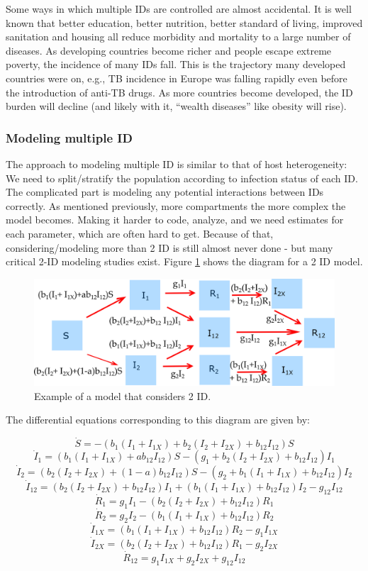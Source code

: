 \documentclass[]{book}
\theoremstyle{definition}
\theoremstyle{definition}
\theoremstyle{definition}
\theoremstyle{remark}
\begin{document}
Some ways in which multiple IDs are controlled are almost accidental. It
is well known that better education, better nutrition, better standard
of living, improved sanitation and housing all reduce morbidity and
mortality to a large number of diseases. As developing countries become
richer and people escape extreme poverty, the incidence of many IDs
fall. This is the trajectory many developed countries were on, e.g., TB
incidence in Europe was falling rapidly even before the introduction of
anti-TB drugs. As more countries become developed, the ID burden will
decline (and likely with it, ``wealth diseases'' like obesity will
rise).

\subsubsection{Modeling multiple ID}\label{myadvancedbox}

The approach to modeling multiple ID is similar to that of host
heterogeneity: We need to split/stratify the population according to
infection status of each ID. The complicated part is modeling any
potential interactions between IDs correctly. As mentioned previously,
more compartments the more complex the model becomes. Making it harder
to code, analyze, and we need estimates for each parameter, which are
often hard to get. Because of that, considering/modeling more than 2 ID
is still almost never done - but many critical 2-ID modeling studies
exist. Figure \ref{fig:coinfection} shows the diagram for a 2 ID model.

\begin{figure}
\centering
\includegraphics{./images/multipathogenmodel.png}
\caption{\label{fig:coinfection}Example of a model that considers 2 ID.}
\end{figure}

The differential equations corresponding to this diagram are given by:

\[\dot S =  -  (b_{1} (I_1+I_{1X}) + b_{2} (I_2+I_{2X}) + b_{12}I_{12}) S  \]
\[\dot I_1 =   (b_{1} (I_1+I_{1X}) + ab_{12} I_{12})S - (g_1  + b_{2} (I_2+I_{2X})  + b_{12}  I_{12}) I_1\]
\[\dot I_2 =   (b_{2} (I_2+I_{2X}) +  (1-a) b_{12} I_{12})S - (g_2 + b_{1}(I_1 + I_{1X}) + b_{12} I_{12}) I_2\]
\[\dot I_{12} = (b_{2} (I_2+I_{2X})  + b_{12}  I_{12}) I_1 + (b_{1}(I_1 + I_{1X}) + b_{12} I_{12}) I_2  - g_{12} I_{12}\]
\[\dot R_1 = g_1 I_1 - (b_2 (I_2 + I_{2X}) + b_{12}  I_{12}) R_1\]
\[\dot R_2 = g_2 I_2 - (b_1 (I_1 + I_{1X}) + b_{12}  I_{12}) R_2\]
\[\dot I_{1X} = (b_1 (I_1 + I_{1X}) + b_{12}  I_{12}) R_2 - g_{1} I_{1X}\]
\[\dot I_{2X} = (b_2 (I_2 + I_{2X}) + b_{12}  I_{12}) R_1 - g_{2} I_{2X}\]
\[\dot R_{12} = g_{1} I_{1X} + g_{2} I_{2X} + g_{12} I_{12} \]
\end{document}
